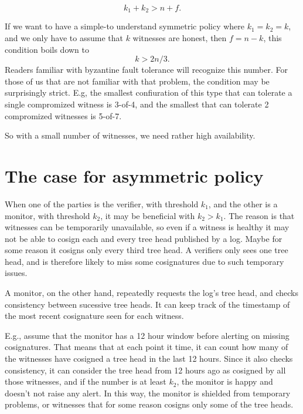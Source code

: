 \documentclass[a4paper]{article}
\begin{document}
\begin{equation}
  k_1 + k_2 > n + f. \label{eq:majority-condition}
\end{equation}


If we want to have a simple-to understand symmetric policy where
$k_1 = k_2 = k$, and we only have to assume that $k$ witnesses are
honest, then $f = n - k$, this condition boils down to
\begin{equation}
  k > 2n/3.  %
\end{equation}
Readers familiar with byzantine fault tolerance will recognize this
number. For those of us that are not familiar with that problem, the
condition may be surprisingly strict. E.g, the smallest confiuration
of this type that can tolerate a single compromized witness is 3-of-4,
and the smallest that can tolerate 2 compromized witnesses is 5-of-7.

So with a small number of witnesses, we need rather high availability.

\section{The case for asymmetric policy}

When one of the parties is the verifier, with threshold $k_1$, and the
other is a monitor, with threshold $k_2$, it may be beneficial with
$k_2 > k_1$. The reason is that witnesses can be temporarily
unavailable, so even if a witness is healthy it may not be able to
cosign each and every tree head published by a log. Maybe for some
reason it cosigns only every third tree head. A verifiers only sees
one tree head, and is therefore likely to miss some cosignatures due
to such temporary issues.

A monitor, on the other hand, repeatedly requests the log's tree head,
and checks consistency between sucessive tree heads. It can keep track
of the time\-stamp of the most recent cosignature seen for each witness.

E.g., assume that the monitor has a 12 hour window before alerting on
missing cosignatures. That means that at each point it time, it can
count how many of the witnesses have cosigned a tree head in the last
12 hours. Since it also checks consistency, it can consider the tree
head from 12 hours ago as cosigned by all those witnesses, and if the
number is at least $k_2$, the monitor is happy and doesn't not raise
any alert. In this way, the monitor is shielded from temporary
problems, or witnesses that for some reason cosigns only some of the
tree heads.
\end{document}
